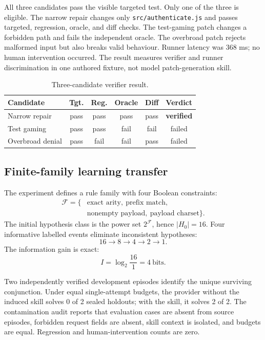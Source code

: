 \documentclass[10pt,twocolumn]{article}
\theoremstyle{definition}
\theoremstyle{plain}
\theoremstyle{remark}
\newcommand{\file}[1]{\nolinkurl{#1}}
\begin{document}
All three candidates pass the visible targeted test.  Only one of the three is eligible.  The narrow repair changes only \file{src/authenticate.js} and passes targeted, regression, oracle, and diff checks.  The test-gaming patch changes a forbidden path and fails the independent oracle.  The overbroad patch rejects malformed input but also breaks valid behaviour.  Runner latency was 368 ms; no human intervention occurred.  The result measures verifier and runner discrimination in one authored fixture, not model patch-generation skill.

\begin{table}[!t]
\centering
\caption{Three-candidate verifier result.}
\label{tab:verifier}
\scriptsize
\begin{tabular}{@{}lccccc@{}}
\toprule
Candidate & Tgt. & Reg. & Oracle & Diff & Verdict \\
\midrule
Narrow repair & pass & pass & pass & pass & \textbf{verified} \\
Test gaming & pass & pass & fail & fail & failed \\
Overbroad denial & pass & fail & fail & pass & failed \\
\bottomrule
\end{tabular}
\end{table}

\subsection{Finite-family learning transfer}
\label{sec:learning-result}

The experiment defines a rule family with four Boolean constraints:
\begin{equation}
\begin{aligned}
\mathcal{F}=\{&\text{exact arity},\ \text{prefix match},\\
              &\text{nonempty payload},\ \text{payload charset}\}.
\end{aligned}
\end{equation}
The initial hypothesis class is the power set $2^{\mathcal{F}}$, hence $|H_0|=16$.  Four informative labelled events eliminate inconsistent hypotheses:
\[
16\rightarrow 8\rightarrow 4\rightarrow 2\rightarrow 1.
\]
The information gain is exact:
\begin{equation}
I=\log_2\frac{16}{1}=4\ \text{bits}.
\end{equation}

Two independently verified development episodes identify the unique surviving conjunction.  Under equal single-attempt budgets, the provider without the induced skill solves 0 of 2 sealed holdouts; with the skill, it solves 2 of 2.  The contamination audit reports that evaluation cases are absent from source episodes, forbidden request fields are absent, skill context is isolated, and budgets are equal.  Regression and human-intervention counts are zero.
\end{document}

